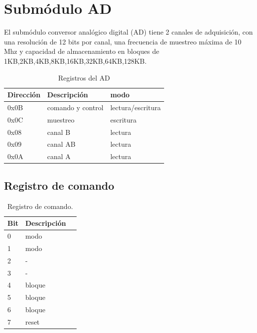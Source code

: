 \section{Subm\'odulo AD}

El subm\'odulo conversor anal\'ogico digital (AD) tiene 2 canales de adquisici\'on,
con una resoluci\'on de 12 bits por canal, una frecuencia de muestreo m\'axima de 10 Mhz 
y capacidad de almacenamiento en bloques de 1KB,2KB,4KB,8KB,16KB,32KB,64KB,128KB.

\begin{table}[ht]
    \centering
    \begin{tabular}{|l|l|l|}
    \hline
     Direcci\'on   & Descripci\'on   & modo\\
    \hline
     0x0B        & comando y control & lectura/escritura\\ 
    \hline
     0x0C        & muestreo          & escritura\\
     \hline
     0x08        & canal B           &lectura   \\
     \hline
     0x09        & canal AB          &lectura   \\
     \hline
     0x0A        & canal A           &lectura   \\
     \hline
\end{tabular}
\caption{\label{tab:registros_ad} Registros del AD}
\end{table}

\subsection{Registro de comando}
\begin{table}[ht]
    \centering
    \begin{tabular}{|l|l|l|}
    \hline
    Bit    & Descripci\'on \\
    \hline
     0 & modo\\ 
    \hline
     1 & modo\\
     \hline
     2 & - \\
     \hline
     3 & - \\
     \hline
     4 & bloque \\
     \hline
     5 & bloque \\
     \hline
     6 & bloque \\
     \hline
     7 & reset \\
     \hline
\end{tabular}
\caption{\label{tab:registros_ad_cmd}Registro de comando.}
\end{table}

